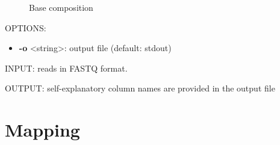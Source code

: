 \documentclass{article}
\begin{document}
\begin{figure}[htbp]
  \centering
{}
  \caption{Base composition}
  \label{fig:base-composition}
\end{figure}

OPTIONS:
\begin{itemize}
\item
\textbf{-o} \textless string\textgreater : output file (default: stdout)
\end{itemize}

INPUT: reads in FASTQ format.

OUTPUT: self-explanatory column names are provided in the output file

\section{Mapping}
\label{sec:mapping}

\end{document}
